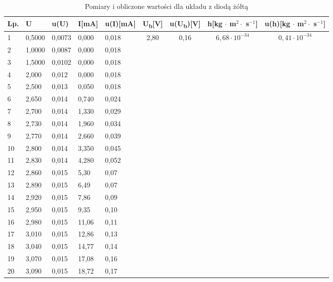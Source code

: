 \documentclass[12pt]{article}
\begin{document}
\begin{table}[]
    \caption*{Pomiary i obliczone wartości dla układu z diodą żółtą}
    \begin{tabular}{|l|l|l|l|l|c|c|c|c|} \hline
        Lp. & U & u(U) & I[mA] & u(I)[mA] & U\textsubscript{b}[V] & u(U\textsubscript{b})[V] & h[kg $\cdot$ m$^2 \cdot$ s$^{-1}$] & u(h)[kg $\cdot$ m$^2 \cdot$ s$^{-1}$] \\ \hline
        1 & 0,5000 & 0,0073 & 0,000 & 0,018 & \multirow{20}{*}{2,80} & \multirow{20}{*}{0,16} & \multirow{20}{*}{$6,68 \cdot 10^{-34}$} & \multirow{20}{*}{$0,41 \cdot 10^{-34}$} \\ \cline{1-5}
        2 & 1,0000 & 0,0087 & 0,000 & 0,018 &  &  &  &  \\ \cline{1-5}
        3 & 1,5000 & 0,0102 & 0,000 & 0,018 &  &  &  &  \\ \cline{1-5}
        4 & 2,000 & 0,012 & 0,000 & 0,018 &  &  &  &  \\ \cline{1-5}
        5 & 2,500 & 0,013 & 0,050 & 0,018 &  &  &  &  \\ \cline{1-5}
        6 & 2,650 & 0,014 & 0,740 & 0,024 &  &  &  &  \\ \cline{1-5}
        7 & 2,700 & 0,014 & 1,330 & 0,029 &  &  &  &  \\ \cline{1-5}
        8 & 2,730 & 0,014 & 1,960 & 0,034 &  &  &  &  \\ \cline{1-5}
        9 & 2,770 & 0,014 & 2,660 & 0,039 &  &  &  &  \\ \cline{1-5}
        10 & 2,800 & 0,014 & 3,350 & 0,045 &  &  &  &  \\ \cline{1-5}
        11 & 2,830 & 0,014 & 4,280 & 0,052 &  &  &  &  \\ \cline{1-5}
        12 & 2,860 & 0,015 & 5,30 & 0,07 &  &  &  &  \\ \cline{1-5}
        13 & 2,890 & 0,015 & 6,49 & 0,07 &  &  &  &  \\ \cline{1-5}
        14 & 2,920 & 0,015 & 7,86 & 0,09 &  &  &  &  \\ \cline{1-5}
        15 & 2,950 & 0,015 & 9,35 & 0,10 &  &  &  &  \\ \cline{1-5}
        16 & 2,980 & 0,015 & 11,06 & 0,11 &  &  &  &  \\ \cline{1-5}
        17 & 3,010 & 0,015 & 12,86 & 0,13 &  &  &  &  \\ \cline{1-5}
        18 & 3,040 & 0,015 & 14,77 & 0,14 &  &  &  &  \\ \cline{1-5}
        19 & 3,070 & 0,015 & 17,08 & 0,16 &  &  &  &  \\ \cline{1-5}
        20 & 3,090 & 0,015 & 18,72 & 0,17 &  &  &  &  \\ \hline
    \end{tabular}
\end{table}
\end{document}
